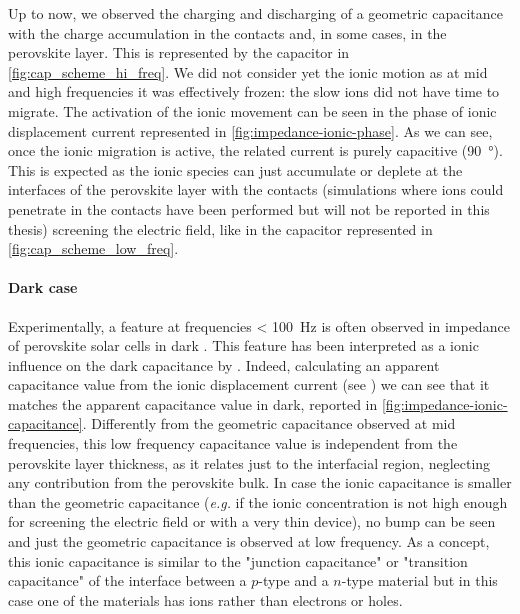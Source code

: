 	Up to now, we observed the charging and discharging of a geometric capacitance with the charge accumulation in the contacts and, in some cases, in the perovskite layer.
	This is represented by the capacitor in \cref{fig:cap_scheme_hi_freq}.
	We did not consider yet the ionic motion as at mid and high frequencies it was effectively frozen: the slow ions did not have time to migrate.
	The activation of the ionic movement can be seen in the phase of ionic displacement current represented in \cref{fig:impedance-ionic-phase}.
	As we can see, once the ionic migration is active, the related current is purely capacitive (\SI{+90}{\degree}).
	This is expected as the ionic species can just accumulate or deplete at the interfaces of the perovskite layer with the contacts (simulations where ions could penetrate in the contacts have been performed but will not be reported in this thesis) screening the electric field, like in the capacitor represented in \cref{fig:cap_scheme_low_freq}.
	



	\paragraph{Dark case}\label{impedance_lowf_dark}
	Experimentally, a feature at frequencies \SI{< 100}{\Hz} is often observed in impedance of perovskite solar cells in dark \cite{Pockett2015,Juarez-Perez2014,Kim2015c,Guerrero2016,Zarazua2016}.
	This feature has been interpreted as a ionic influence on the dark capacitance by .
	Indeed, calculating an apparent capacitance value from the ionic displacement current (see ) we can see that it matches the apparent capacitance value in dark, reported in \cref{fig:impedance-ionic-capacitance}.
	Differently from the geometric capacitance observed at mid frequencies, this low frequency capacitance value is independent from the perovskite layer thickness, as it relates just to the interfacial region, neglecting any contribution from the perovskite bulk.
	In case the ionic capacitance is smaller than the geometric capacitance (\textsl{e.g.} if the ionic concentration is not high enough for screening the electric field or with a very thin device), no bump can be seen and just the geometric capacitance is observed at low frequency.
	As a concept, this ionic capacitance is similar to the "junction capacitance" or "transition capacitance" of the interface between a $p$-type and a $n$-type material but in this case one of the materials has ions rather than electrons or holes.




